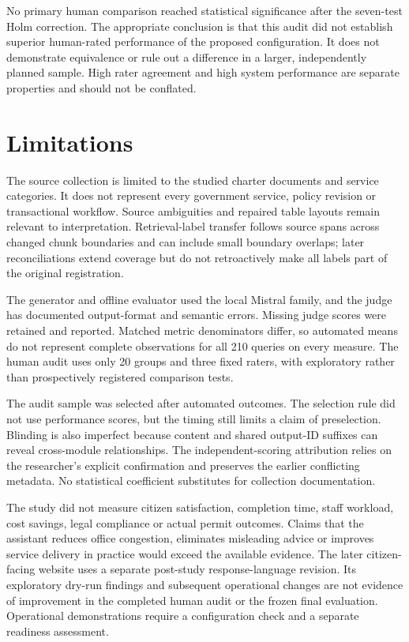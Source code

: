 No primary human comparison reached statistical significance after the seven-test Holm correction. The appropriate conclusion is that this audit did not establish superior human-rated performance of the proposed configuration. It does not demonstrate equivalence or rule out a difference in a larger, independently planned sample. High rater agreement and high system performance are separate properties and should not be conflated.


\section{Limitations}

The source collection is limited to the studied charter documents and service categories. It does not represent every government service, policy revision or transactional workflow. Source ambiguities and repaired table layouts remain relevant to interpretation. Retrieval-label transfer follows source spans across changed chunk boundaries and can include small boundary overlaps; later reconciliations extend coverage but do not retroactively make all labels part of the original registration.


The generator and offline evaluator used the local Mistral family, and the judge has documented output-format and semantic errors. Missing judge scores were retained and reported. Matched metric denominators differ, so automated means do not represent complete observations for all 210 queries on every measure. The human audit uses only 20 groups and three fixed raters, with exploratory rather than prospectively registered comparison tests.


The audit sample was selected after automated outcomes. The selection rule did not use performance scores, but the timing still limits a claim of preselection. Blinding is also imperfect because content and shared output-ID suffixes can reveal cross-module relationships. The independent-scoring attribution relies on the researcher's explicit confirmation and preserves the earlier conflicting metadata. No statistical coefficient substitutes for collection documentation.


The study did not measure citizen satisfaction, completion time, staff workload, cost savings, legal compliance or actual permit outcomes. Claims that the assistant reduces office congestion, eliminates misleading advice or improves service delivery in practice would exceed the available evidence. The later citizen-facing website uses a separate post-study response-language revision. Its exploratory dry-run findings and subsequent operational changes are not evidence of improvement in the completed human audit or the frozen final evaluation. Operational demonstrations require a configuration check and a separate readiness assessment.


